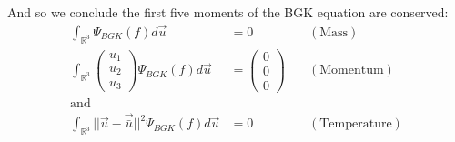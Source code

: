 %
And so we conclude the first five moments of the BGK equation are conserved:
%
\begin{align*}
\int_{\mathbb{R}^3} \Psi_{BGK} (f) d\vec{u} &= 0 \quad & (\text{Mass})\\
\int_{\mathbb{R}^3} \left( \begin{array}{c} u_1 \\ u_2 \\ u_3 \end{array} \right) \Psi_{BGK} (f) d\vec{u} &= \left( \begin{array}{c} 0 \\ 0 \\ 0 \end{array} \right) \quad & (\text{Momentum}) \\
\text{and}\\
\int_{\mathbb{R}^3} ||\vec{u} - \vec{\bar{u}}||^2 \Psi_{BGK} (f) d\vec{u} &= 0 \quad & (\text{Temperature})\\
\end{align*}
%
